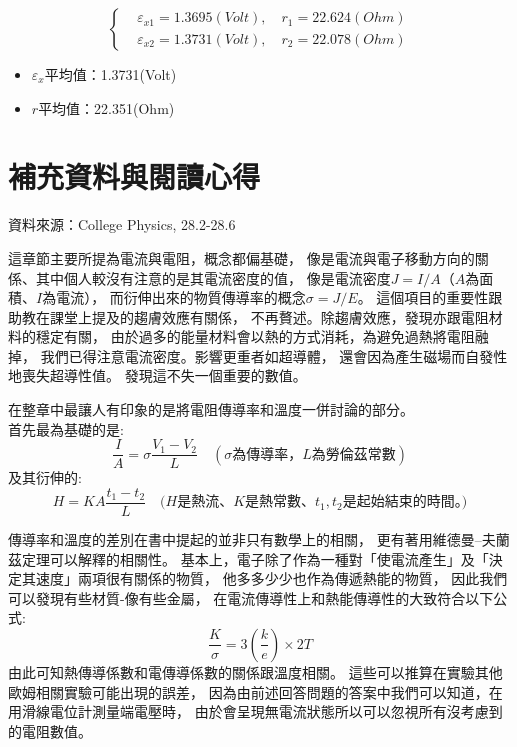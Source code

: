 \documentclass[12pt]{article}
\begin{document}
                $$
                \begin{cases}
                    &\varepsilon_{x1}=1.3695(Volt), \quad r_1 = 22.624(Ohm)\\
                    &\varepsilon_{x2}=1.3731(Volt), \quad r_2 = 22.078(Ohm)
                \end{cases}
                $$
                \begin{itemize}
                    \item $\varepsilon_x$平均值：1.3731(Volt)
                    \item $r$平均值：22.351(Ohm)
                \end{itemize}

    \section{補充資料與閱讀心得}
        
        \noindent 資料來源：College Physics, 28.2-28.6
         

        這章節主要所提為電流與電阻，概念都偏基礎，
        像是電流與電子移動方向的關係、其中個人較沒有注意的是其電流密度的值，
        像是電流密度$J=I/A$（$A$為面積、$I$為電流），
        而衍伸出來的物質傳導率的概念$\sigma=J/E$。
        這個項目的重要性跟助教在課堂上提及的趨膚效應有關係，
        不再贅述。除趨膚效應，發現亦跟電阻材料的穩定有關，
        由於過多的能量材料會以熱的方式消耗，為避免過熱將電阻融掉，
        我們已得注意電流密度。影響更重者如超導體，
        還會因為產生磁場而自發性地喪失超導性值。
        發現這不失一個重要的數值。
        
        \noindent 在整章中最讓人有印象的是將電阻傳導率和溫度一併討論的部分。\\
        首先最為基礎的是:
        $$\frac{I}{A}=\sigma \frac{V_1-V_2}{L}\quad (\sigma\text{為傳導率，}L\text{為勞倫茲常數})$$
        \noindent 及其衍伸的:
        $$H=KA\frac{t_1-t_2}{L}\quad 
        \text{($H$是熱流、$K$是熱常數、$t_1, t_2$是起始結束的時間。)}$$

        傳導率和溫度的差別在書中提起的並非只有數學上的相關，
        更有著用維德曼–夫蘭茲定理可以解釋的相關性。
        基本上，電子除了作為一種對「使電流產生」及「決定其速度」兩項很有關係的物質，
        他多多少少也作為傳遞熱能的物質，
        因此我們可以發現有些材質-像有些金屬，
        在電流傳導性上和熱能傳導性的大致符合以下公式:
        $$\frac{K}{\sigma}=3(\frac{k}{e})\times 2T$$
        由此可知熱傳導係數和電傳導係數的關係跟溫度相關。
        這些可以推算在實驗其他歐姆相關實驗可能出現的誤差，
        因為由前述回答問題的答案中我們可以知道，在用滑線電位計測量端電壓時，
        由於會呈現無電流狀態所以可以忽視所有沒考慮到的電阻數值。
         
\end{document}
